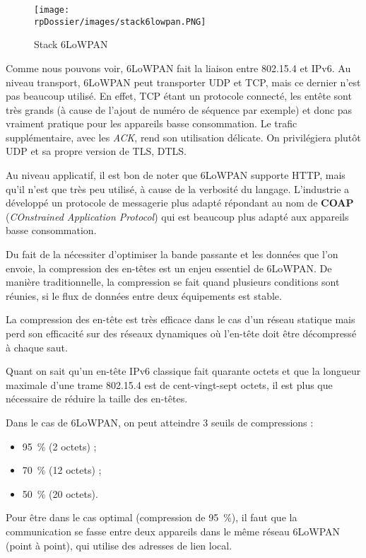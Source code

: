 \begin{figure}[H]
\centering
\texttt{[image: \\rpDossier/images/stack6lowpan.PNG]}
\caption{Stack 6LoWPAN}
\label{stack6lowpan}
\end{figure}

Comme nous pouvons voir, 6LoWPAN fait la liaison entre 802.15.4 et IPv6. Au niveau transport, 6LoWPAN peut transporter UDP et TCP, mais ce dernier n'est pas beaucoup utilisé. En effet, TCP étant un protocole connecté, les entête sont très grands (à cause de l'ajout de numéro de séquence par exemple) et donc pas vraiment pratique pour les appareils basse consommation. Le trafic supplémentaire, avec les \textit{ACK}, rend son utilisation délicate. On privilégiera plutôt UDP et sa propre version de TLS, DTLS. 

Au niveau applicatif, il est bon de noter que 6LoWPAN supporte HTTP, mais qu’il n’est que très peu utilisé, à cause de la verbosité du langage. L'industrie a développé un protocole de messagerie plus adapté répondant au nom de \textbf{COAP} (\textit{COnstrained Application Protocol}) qui est beaucoup plus adapté aux appareils basse consommation.

Du fait de la nécessiter d'optimiser la bande passante et les données que l'on envoie, la compression des en-têtes est un enjeu essentiel de 6LoWPAN. De manière traditionnelle, la compression se fait quand plusieurs conditions sont réunies, si le flux de données entre deux équipements est stable.

La compression des en-tête est très efficace dans le cas d’un réseau statique mais perd son efficacité sur des réseaux dynamiques où l'en-tête doit être décompressé à chaque saut.

Quant on sait qu'un en-tête IPv6 classique fait quarante octets et que la longueur maximale d'une trame 802.15.4 est de cent-vingt-sept octets, il est plus que nécessaire de réduire la taille des en-têtes.

Dans le cas de 6LoWPAN, on peut atteindre 3 seuils de compressions :
\begin{itemize}
	\item 95~\% (2 octets) ;
	\item 70~\% (12 octets) ;
	\item 50~\% (20 octets).
\end{itemize}

Pour être dans le cas optimal (compression de 95~\%), il faut que la communication se fasse entre deux appareils dans le même réseau 6LoWPAN (point à point), qui utilise des adresses de lien local.

